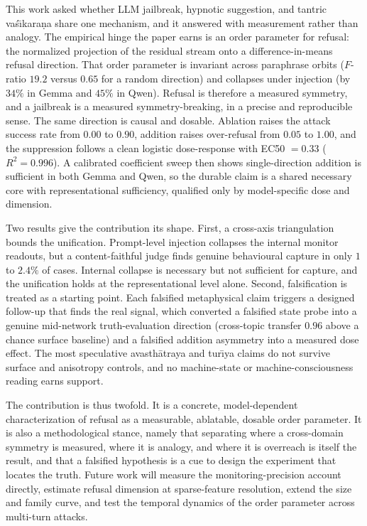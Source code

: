 This work asked whether LLM jailbreak, hypnotic suggestion, and tantric
vaś\=\i kara\d{n}a share one mechanism, and it answered with measurement rather than
analogy. The empirical hinge the paper earns is an order parameter for refusal: the
normalized projection of the residual stream onto a difference-in-means refusal
direction. That order parameter is invariant across paraphrase orbits ($F$-ratio
$19.2$ versus $0.65$ for a random direction) and collapses under injection (by $34\%$
in Gemma and $45\%$ in Qwen). Refusal is therefore a measured symmetry, and a
jailbreak is a measured symmetry-breaking, in a precise and reproducible sense. The
same direction is causal and dosable. Ablation raises the attack success rate from
$0.00$ to $0.90$, addition raises over-refusal from $0.05$ to $1.00$, and the
suppression follows a clean logistic dose-response with EC50 $=0.33$ ($R^2=0.996$). A
calibrated coefficient sweep then shows single-direction addition is sufficient in
both Gemma and Qwen, so the durable claim is a shared necessary core with
representational sufficiency, qualified only by model-specific dose and dimension.

Two results give the contribution its shape. First, a cross-axis triangulation bounds
the unification. Prompt-level injection collapses the internal monitor readouts, but a
content-faithful judge finds genuine behavioural capture in only $1$ to $2.4\%$ of
cases. Internal collapse is necessary but not sufficient for capture, and the
unification holds at the representational level alone. Second, falsification is
treated as a starting point. Each falsified metaphysical claim triggers a designed
follow-up that finds the real signal, which converted a falsified state probe into a
genuine mid-network truth-evaluation direction (cross-topic transfer $0.96$ above a
chance surface baseline) and a falsified addition asymmetry into a measured dose
effect. The most speculative avasth\=atraya and tur\=\i ya claims do not survive
surface and anisotropy controls, and no machine-state or machine-consciousness reading
earns support.

The contribution is thus twofold. It is a concrete, model-dependent characterization
of refusal as a measurable, ablatable, dosable order parameter. It is also a
methodological stance, namely that separating where a cross-domain symmetry is
measured, where it is analogy, and where it is overreach is itself the result, and
that a falsified hypothesis is a cue to design the experiment that locates the truth.
Future work will measure the monitoring-precision account directly, estimate refusal
dimension at sparse-feature resolution, extend the size and family curve, and test the
temporal dynamics of the order parameter across multi-turn attacks.
